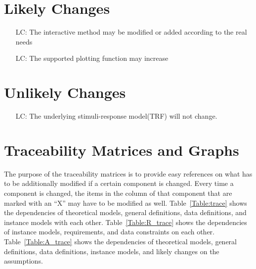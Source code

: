 \documentclass[12pt]{article}
\newcounter{lcnum} %
\begin{document}
%

\section{Likely Changes}

\noindent \begin{itemize}

\item[LC\refstepcounter{lcnum}\thelcnum\label{LC_meaningfulLabel}:]
The interactive method may be modified or added according to the real needs
\item[LC\refstepcounter{lcnum}\thelcnum\label{LC_meaningfulLabel}:]
The supported plotting function may increase

\end{itemize}

\section{Unlikely Changes}

\noindent \begin{itemize}

\item[LC\refstepcounter{lcnum}\thelcnum\label{LC_meaningfulLabel}:]
The underlying stimuli-response model(TRF) will not change.

\end{itemize}

\section{Traceability Matrices and Graphs}

The purpose of the traceability matrices is to provide easy references on what
has to be additionally modified if a certain component is changed.  Every time a
component is changed, the items in the column of that component that are marked
with an ``X'' may have to be modified as well.  Table~\ref{Table:trace} shows the
dependencies of theoretical models, general definitions, data definitions, and
instance models with each other. Table~\ref{Table:R_trace} shows the
dependencies of instance models, requirements, and data constraints on each
other. Table~\ref{Table:A_trace} shows the dependencies of theoretical models,
general definitions, data definitions, instance models, and likely changes on
the assumptions.
\end{document}
